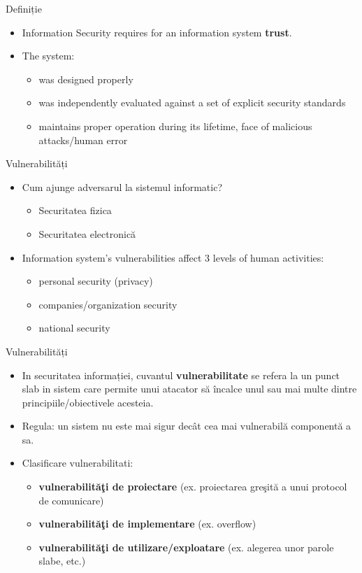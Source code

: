\documentclass[pdf]{beamer}
\begin{document}
\begin{frame}{Definiție}
\begin{itemize}
\item
Information Security requires for an information system \textbf{trust}.
\item
The system:
\begin{itemize}
\item
was designed properly
\item
was independently evaluated against a set of explicit security standards
\item
maintains proper operation during its lifetime, face of malicious attacks/human error
\end{itemize}
\end{itemize}
\end{frame}



\begin{frame}{Vulnerabilități}
\begin{itemize}
\item
Cum ajunge adversarul la sistemul informatic?
\begin{itemize}
\item
Securitatea fizica
\item
Securitatea electronică
\end{itemize}
\item
Information system’s vulnerabilities affect 3 levels of human activities:
\begin{itemize}
\item
personal security (privacy)
\item
companies/organization security
\item
national security
\end{itemize}
\end{itemize}
\end{frame}



\begin{frame}{Vulnerabilități}
\begin{itemize}
\item
In securitatea informației, cuvantul \textbf{vulnerabilitate} se refera la un punct slab in sistem care permite unui atacator să încalce unul sau mai multe dintre principiile/obiectivele acesteia.

\item
Regula: un sistem nu este mai sigur decât cea mai vulnerabilă componentă a sa.

\item
Clasificare vulnerabilitati:
\begin{itemize}
\item
\textbf{vulnerabilităţi de proiectare} (ex. proiectarea greşită a unui protocol de comunicare)
\item
\textbf{vulnerabilităţi de implementare} (ex. overflow) 
\item
\textbf{vulnerabilităţi de utilizare/exploatare} (ex. alegerea unor parole slabe, etc.)
\end{itemize}
\end{itemize}
\end{frame}
\end{document}
